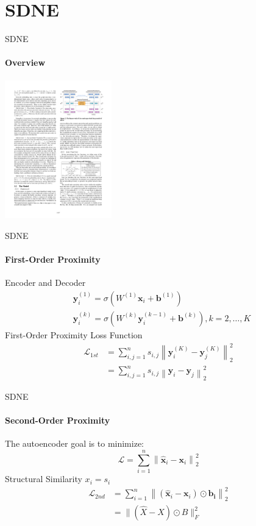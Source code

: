 \documentclass{beamer}
\begin{document}
\section{SDNE}
\begin{frame}{SDNE}
    \framesubtitle{Overview}
    \centering\includegraphics[height=6cm]{SDNE.pdf}
\end{frame}
\begin{frame}{SDNE}
    \framesubtitle{First-Order Proximity}
    Encoder and Decoder
    $$
    \begin{aligned}
    &\mathbf{y}_{i}^{(1)}=\sigma\left(W^{(1)} \mathbf{x}_{i}+\mathbf{b}^{(1)}\right) \\
    &\mathbf{y}_{i}^{(k)}=\sigma\left(W^{(k)} \mathbf{y}_{i}^{(k-1)}+\mathbf{b}^{(k)}\right), k=2, \ldots, K
    \end{aligned}
    $$
    First-Order Proximity Loss Function
    $$
    \begin{aligned}
    \mathcal{L}_{1 s t} &=\sum_{i, j=1}^{n} s_{i, j}\left\|\mathbf{y}_{i}^{(K)}-\mathbf{y}_{j}^{(K)}\right\|_{2}^{2} \\
    &=\sum_{i, j=1}^{n} s_{i, j}\left\|\mathbf{y}_{i}-\mathbf{y}_{j}\right\|_{2}^{2}
    \end{aligned}
    $$
\end{frame}
\begin{frame}{SDNE}
    \framesubtitle{Second-Order Proximity}
    The autoencoder goal is to minimize:
    $$
    \mathcal{L}=\sum_{i=1}^{n}\left\|\hat{\mathbf{x}}_{i}-\mathbf{x}_{i}\right\|_{2}^{2}
    $$
    {Structural Similarity $x_i=s_i$} 
    $$
    \begin{aligned}
    \mathcal{L}_{2 n d} &=\sum_{i=1}^{n}\left\|\left(\hat{\mathbf{x}}_{i}-\mathbf{x}_{i}\right) \odot \mathbf{b}_{\mathbf{i}}\right\|_{2}^{2} \\
    &=\|(\hat{X}-X) \odot B\|_{F}^{2}
    \end{aligned}
    $$
\end{frame}
\end{document}
